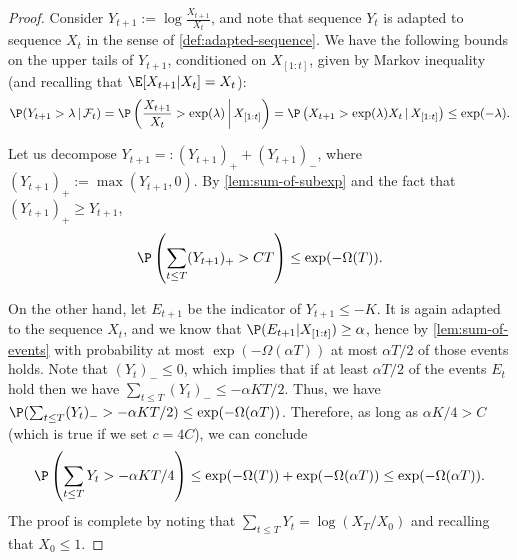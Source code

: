 \documentclass[11pt]{article}
\begin{document}
\begin{proof}
	Consider $Y_{t+1} := \log \frac{X_{t+1}}{X_t}$, and note that sequence $Y_{t}$ is adapted to sequence $X_t$ in the sense of \cref{def:adapted-sequence}. We have the following bounds on the upper tails of $Y_{t+1}$, conditioned on $X_{[1: t]}$, given by Markov inequality (and recalling that $\E[X_{t+1}|X_t]=X_t$):
	\begin{equation*}
		\P(Y_{t+1} > \lambda \,|\, \mathcal{F}_t) = \P\left(\frac{X_{t+1}}{X_t} > \exp(\lambda) \,\middle|\, X_{[1: t]}\right) = \P\left(X_{t+1} > \exp(\lambda) X_{t} \,|\, X_{[1: t]}\right) \leq \exp(-\lambda).
	\end{equation*}
	
	Let us decompose $Y_{t+1} =: (Y_{t+1})_+ + (Y_{t+1})_-$, where $(Y_{t+1})_+ := \max(Y_{t+1}, 0)$. By \cref{lem:sum-of-subexp} and the fact that $(Y_{t+1})_+\ge Y_{t+1}$,
	\begin{equation*}
		\P\left(\sum_{t \leq T} (Y_{t+1})_+ > C T\right) \le \exp(-\Omega(T)).
	\end{equation*}
	
	On the other hand, let $E_{t+1}$ be the indicator of $Y_{t+1} \leq - K$. It is again adapted to the sequence $X_t$, and we know that $\P(E_{t+1} | X_{[1: t]}) \geq \alpha$, hence by \cref{lem:sum-of-events} with probability at most $\exp(-\Omega(\alpha T))$ at most $\alpha T/2$ of those events holds. Note that $(Y_t)_{-}\le 0$, which implies that if at least $\alpha T/2$ of the events $E_t$ hold then we have $\sum_{t \leq T} (Y_t)_{-} \le - \alpha K T/2$. Thus, we have $\P(\sum_{t \leq T} (Y_t)_{-} > - \alpha K T/2) \le \exp(-\Omega(\alpha T))$. Therefore, as long as $\alpha K/4 > C$ (which is true if we set $c=4C$), we can conclude
	\begin{equation*}
		\P\left(\sum_{t\leq T} Y_t > - \alpha KT/4\right) \leq \exp(-\Omega(T)) + \exp(-\Omega(\alpha T )) \le \exp(-\Omega(\alpha T)).
	\end{equation*}
	The proof is complete by noting that $\sum_{t\le T} Y_t=\log(X_T/X_0)$ and recalling that $X_0\le 1$.

\end{proof}
\end{document}
